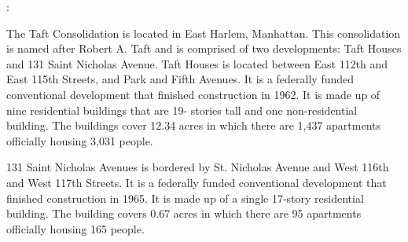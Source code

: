 :    

  

The Taft Consolidation is located in East Harlem, Manhattan. This consolidation is named after Robert A. Taft and is comprised of two developments: Taft Houses and 131 Saint Nicholas Avenue. Taft Houses is located between East 112th and East 115th Streets, and Park and Fifth Avenues. It is a federally funded conventional development that finished construction in 1962. It is made up of nine residential buildings that are 19- stories tall and one non-residential building. The buildings cover 12.34 acres in which there are 1,437 apartments officially housing 3,031 people.

131 Saint Nicholas Avenues is bordered by St. Nicholas Avenue and West 116th and West 117th Streets. It is a federally funded conventional development that finished construction in 1965. It is made up of  a single 17-story residential building. The building covers 0.67 acres in which there are 95 apartments officially housing 165 people.